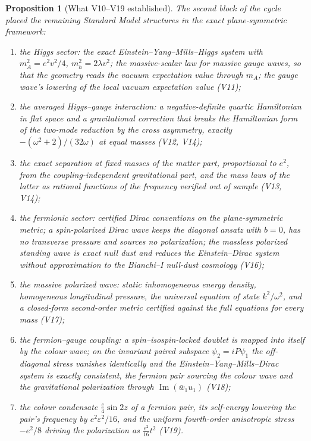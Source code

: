 \documentclass[11pt]{article}
\newtheorem{proposition}[theorem]{Proposition}
\theoremstyle{remark}
\begin{document}
\begin{proposition}[What V10--V19 established]
\label{prop:v20v20-sweep}
The second block of the cycle placed the remaining Standard Model
structures in the exact plane-symmetric framework:

\begin{enumerate}
\item the Higgs sector: the exact Einstein--Yang--Mills--Higgs system
with \(m_A^2=e^2v^2/4\), \(m_h^2=2\lambda v^2\); the massive-scalar
law for massive gauge waves, so that the geometry reads the vacuum
expectation value through \(m_A\); the gauge wave's lowering of the
local vacuum expectation value (V11);
\item the averaged Higgs--gauge interaction: a negative-definite
quartic Hamiltonian in flat space and a gravitational correction that
breaks the Hamiltonian form of the two-mode reduction by the cross
asymmetry, exactly \(-(\omega^2+2)/(32\omega)\) at equal masses (V12,
V14);
\item the exact separation at fixed masses of the matter part,
proportional to \(e^2\), from the coupling-independent gravitational
part, and the mass laws of the latter as rational functions of the
frequency verified out of sample (V13, V14);
\item the fermionic sector: certified Dirac conventions on the
plane-symmetric metric; a spin-polarized Dirac wave keeps the
diagonal ansatz with \(b=0\), has no transverse pressure and sources
no polarization; the massless polarized standing wave is exact null
dust and reduces the Einstein--Dirac system without approximation to
the Bianchi--I null-dust cosmology (V16);
\item the massive polarized wave: static inhomogeneous energy
density, homogeneous longitudinal pressure, the universal equation of
state \(k^2/\omega^2\), and a closed-form second-order metric certified
against the full equations for every mass (V17);
\item the fermion--gauge coupling: a spin--isospin-locked doublet is
mapped into itself by the colour wave; on the invariant paired
subspace \(\psi_2=iP\psi_1\) the off-diagonal stress vanishes
identically and the Einstein--Yang--Mills--Dirac system is exactly
consistent, the fermion pair sourcing the colour wave and the
gravitational polarization through \(\operatorname{Im}(\bar w_1u_1)\)
(V18);
\item the colour condensate \(\tfrac e4\sin2z\) of a fermion pair, its
self-energy lowering the pair's frequency by \(e^2\varepsilon^2/16\),
and the uniform fourth-order anisotropic stress \(-e^2/8\) driving the
polarization as \(\tfrac{e^2}{16}t^2\) (V19).
\end{enumerate}
\end{proposition}
\end{document}
